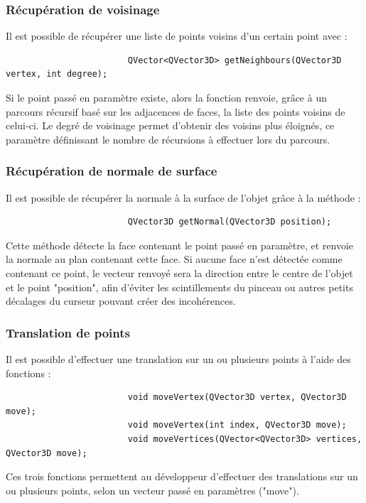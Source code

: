 \documentclass[a4paper]{memoir}
\begin{document}
				\subsubsection{Récupération de voisinage}
					Il est possible de récupérer une liste de points voisins d'un certain point avec :
					\begin{verbatim}
						QVector<QVector3D> getNeighbours(QVector3D vertex, int degree);
					\end{verbatim}
					Si le point passé en paramètre existe, alors la fonction renvoie, grâce à un parcours récursif basé sur les adjacences de faces, la 
					liste des points voisins de celui-ci. Le degré de voisinage permet d'obtenir des voisins plus éloignés, ce paramètre définissant le 
					nombre de récursions à effectuer lors du parcours.
					
				\subsubsection{Récupération de normale de surface}
					Il est possible de récupérer la normale à la surface de l'objet grâce à la méthode :
					\begin{verbatim}
						QVector3D getNormal(QVector3D position);
					\end{verbatim}
					Cette méthode détecte la face contenant le point passé en paramètre, et renvoie la normale au plan contenant cette face. Si aucune face 
					n'est détectée comme contenant ce point, le vecteur renvoyé sera la direction entre le centre de l'objet et le point "position", afin 
					d'éviter les scintillements du pinceau ou autres petits décalages du curseur pouvant créer des incohérences.
					
				\subsubsection{Translation de points}
					Il est possible d'effectuer une translation sur un ou plusieurs points à l'aide des fonctions :
					\begin{verbatim}
						void moveVertex(QVector3D vertex, QVector3D move);
						void moveVertex(int index, QVector3D move);
						void moveVertices(QVector<QVector3D> vertices, QVector3D move);
					\end{verbatim}
					Ces trois fonctions permettent au développeur d'effectuer des translations sur un ou plusieurs points, selon un vecteur passé en 
					paramètres ("move").
					
\end{document}
